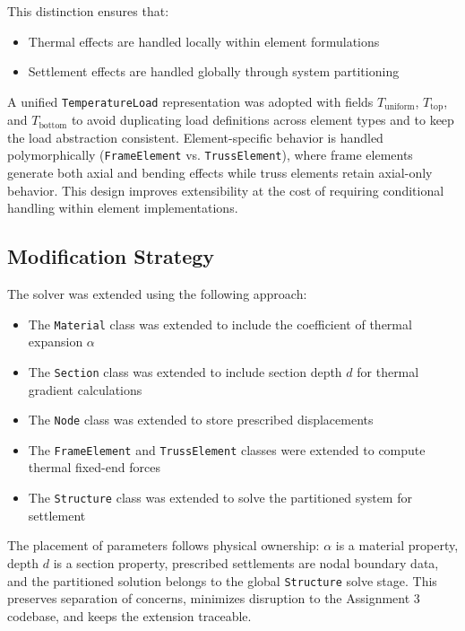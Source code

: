 This distinction ensures that:

\begin{itemize}
    \item Thermal effects are handled locally within element formulations
    \item Settlement effects are handled globally through system partitioning
\end{itemize}

A unified \texttt{TemperatureLoad} representation was adopted with fields $T_{\text{uniform}}$, $T_{\text{top}}$, and $T_{\text{bottom}}$ to avoid duplicating load definitions across element types and to keep the load abstraction consistent. Element-specific behavior is handled polymorphically (\texttt{FrameElement} vs. \texttt{TrussElement}), where frame elements generate both axial and bending effects while truss elements retain axial-only behavior. This design improves extensibility at the cost of requiring conditional handling within element implementations.

\subsection{Modification Strategy}

The solver was extended using the following approach:

\begin{itemize}
    \item The \texttt{Material} class was extended to include the coefficient of thermal expansion $\alpha$
    \item The \texttt{Section} class was extended to include section depth $d$ for thermal gradient calculations
    \item The \texttt{Node} class was extended to store prescribed displacements
    \item The \texttt{FrameElement} and \texttt{TrussElement} classes were extended to compute thermal fixed-end forces
    \item The \texttt{Structure} class was extended to solve the partitioned system for settlement
\end{itemize}

The placement of parameters follows physical ownership: $\alpha$ is a material property, depth $d$ is a section property, prescribed settlements are nodal boundary data, and the partitioned solution belongs to the global \texttt{Structure} solve stage. This preserves separation of concerns, minimizes disruption to the Assignment 3 codebase, and keeps the extension traceable.

